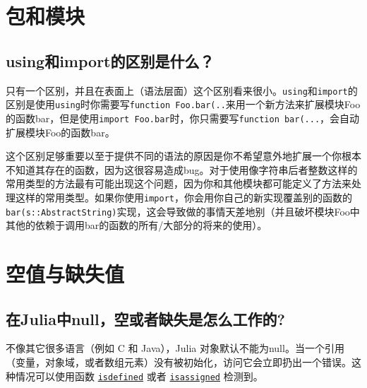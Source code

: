 \section{包和模块}



\hypertarget{18070754917834956483}{}


\subsection{{\textquotedbl}using{\textquotedbl}和{\textquotedbl}import{\textquotedbl}的区别是什么？}



只有一个区别，并且在表面上（语法层面）这个区别看来很小。\texttt{using}和\texttt{import}的区别是使用\texttt{using}时你需要写\texttt{function Foo.bar(..}来用一个新方法来扩展模块Foo的函数bar，但是使用\texttt{import Foo.bar}时，你只需要写\texttt{function bar(...}，会自动扩展模块Foo的函数bar。



这个区别足够重要以至于提供不同的语法的原因是你不希望意外地扩展一个你根本不知道其存在的函数，因为这很容易造成bug。对于使用像字符串后者整数这样的常用类型的方法最有可能出现这个问题，因为你和其他模块都可能定义了方法来处理这样的常用类型。如果你使用\texttt{import}，你会用你自己的新实现覆盖别的函数的\texttt{bar(s::AbstractString)}实现，这会导致做的事情天差地别（并且破坏模块Foo中其他的依赖于调用bar的函数的所有/大部分的将来的使用）。



\hypertarget{16234869582973036611}{}


\section{空值与缺失值}



\hypertarget{7783935872990633567}{}


\subsection{在Julia中{\textquotedbl}null{\textquotedbl}，{\textquotedbl}空{\textquotedbl}或者{\textquotedbl}缺失{\textquotedbl}是怎么工作的?}



不像其它很多语言（例如 C 和 Java），Julia 对象默认不能为{\textquotedbl}null{\textquotedbl}。当一个引用（变量，对象域，或者数组元素）没有被初始化，访问它会立即扔出一个错误。这种情况可以使用函数 \hyperlink{11212950246505288748}{\texttt{isdefined}} 或者 \hyperlink{976355747478401147}{\texttt{isassigned}} 检测到。



